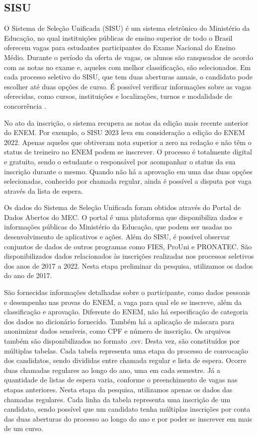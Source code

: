\subsection{SISU}
O Sistema de Seleção Unificada (SISU) é um sistema eletrônico do Ministério da Educação, no qual instituições públicas de ensino superior de todo o Brasil oferecem vagas para estudantes participantes do Exame Nacional do Ensino Médio. Durante o período da oferta de vagas, os alunos são ranqueados de acordo com as notas no exame e, aqueles com melhor classificação, são selecionados. Em cada processo seletivo do SISU, que tem duas aberturas anuais, o candidato pode escolher até duas opções de curso. É possível verificar informações sobre as vagas oferecidas, como cursos, instituições e localizações, turnos e modalidade de concorrência \autocite{mec:1}.

No ato da inscrição, o sistema recupera as notas da edição mais recente anterior do ENEM. Por exemplo, o SISU 2023 leva em consideração a edição do ENEM 2022. Apenas aqueles que obtiveram nota superior a zero na redação e não têm o status de treineiro no ENEM podem se inscrever. O processo é totalmente digital e gratuito, sendo o estudante o responsável por acompanhar o status da sua inscrição durante o mesmo. Quando não há a aprovação em uma das duas opções selecionadas, conhecido por chamada regular, ainda é possível a disputa por vaga através da lista de espera.

Os dados do Sistema de Seleção Unificada foram obtidos através do Portal de Dados Abertos do MEC. O portal é uma plataforma que disponibiliza dados e informações públicas do Ministério da Educação, que podem ser usadas no desenvolvimento de aplicativos e ações. Além do SISU, é possível observar conjuntos de dados de outros programas como FIES, ProUni e PRONATEC. São disponibilizados dados relacionados às inscrições realizadas nos processos seletivos dos anos de 2017 a 2022.  Nesta etapa preliminar da pesquisa, utilizamos os dados do ano de 2017.

São fornecidas informações detalhadas sobre o participante, como dados pessoais e desempenho nas provas do ENEM, a vaga para qual ele se inscreve, além da classificação e aprovação. Diferente do ENEM, não há especificação de categoria dos dados no dicionário fornecido. Também há a aplicação de máscara para anonimizar dados sensíveis, como CPF e número de inscrição. Os arquivos também são disponibilizados no formato .csv. Desta vez, são constituídos por múltiplas tabelas. Cada tabela representa uma etapa do processo de convocação dos candidatos, sendo divididas entre chamada regular e lista de espera. Ocorre duas chamadas regulares ao longo do ano, uma em cada semestre. Já a quantidade de listas de espera varia, conforme o preenchimento de vagas nas etapas anteriores. Nesta etapa da pesquisa, utilizamos apenas os dados das chamadas regulares. Cada linha da tabela representa uma inscrição de um candidato, sendo possível que um candidato tenha múltiplas inscrições por conta das duas aberturas do processo ao longo do ano e por poder se inscrever em mais de um curso.

